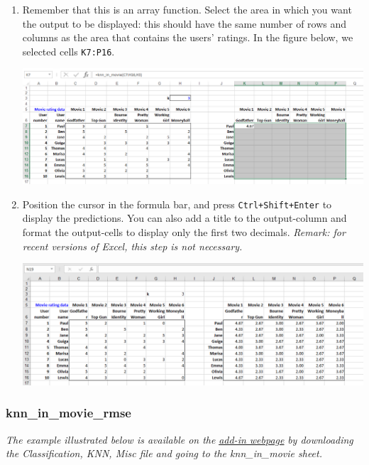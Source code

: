 \documentclass[12pt]{article}
\begin{document}
\begin{enumerate}
\medskip

\item Remember that this is an array function. Select the area in which you want the output to be displayed: this should have the same number of rows and columns as the area that contains the users' ratings. In the figure below, we selected cells \texttt{K7:P16}.

\medskip

\centerline{\includegraphics[width=5.8in]{figures/knninmovie3}}

\medskip

\item Position the cursor in the formula bar, and press \texttt{Ctrl+Shift+Enter} to display the predictions. You can also add a title to the output-column and format the output-cells to display only the first two decimals. \textit{Remark: for recent versions of Excel, this step is not necessary.}

\medskip

\centerline{\includegraphics[width=5.8in]{figures/knninmovie4}}

\medskip
\end{enumerate}

\subsubsection{knn\_in\_movie\_rmse}

\textit{The example illustrated below is available on the}  \href{https://www8.gsb.columbia.edu/bizanalytics/excel-add-in/multiplatform#h-4}{ \textit{add-in webpage}}
 \textit{by downloading the Classification, KNN, Misc file and going to the knn\_in\_movie sheet.}
\end{document}
